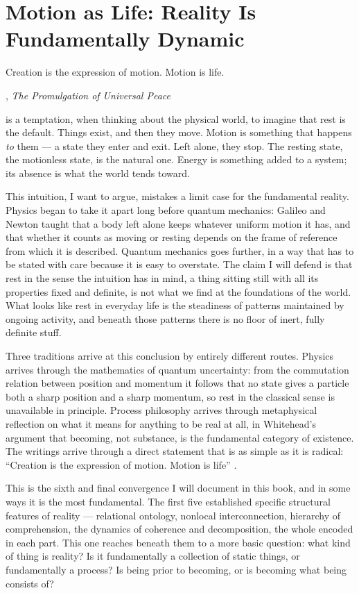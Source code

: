\chapter{Motion as Life: Reality Is Fundamentally Dynamic}
\label{ch:motion-as-life}

\epigraph{Creation is the expression of motion. Motion is life.}{\AbdulBaha,
  \textit{The Promulgation of Universal Peace}}

 is a temptation, when thinking about the physical world, to imagine that rest is the default. Things exist, and then they move. Motion is something that happens \emph{to} them — a state they enter and exit. Left alone, they stop. The resting state, the motionless state, is the natural one. Energy is something added to a system; its absence is what the world tends toward.

This intuition, I want to argue, mistakes a limit case for the fundamental reality. Physics began to take it apart long before quantum mechanics: Galileo and Newton taught that a body left alone keeps whatever uniform motion it has, and that whether it counts as moving or resting depends on the frame of reference from which it is described. Quantum mechanics goes further, in a way that has to be stated with care because it is easy to overstate. The claim I will defend is that rest in the sense the intuition has in mind, a thing sitting still with all its properties fixed and definite, is not what we find at the foundations of the world. What looks like rest in everyday life is the steadiness of patterns maintained by ongoing activity, and beneath those patterns there is no floor of inert, fully definite stuff.

Three traditions arrive at this conclusion by entirely different routes. Physics arrives through the mathematics of quantum uncertainty: from the commutation relation between position and momentum it follows that no state gives a particle both a sharp position and a sharp momentum, so rest in the classical sense is unavailable in principle. Process philosophy arrives through metaphysical reflection on what it means for anything to be real at all, in Whitehead's argument that becoming, not substance, is the fundamental category of existence. The \bahai writings arrive through a direct statement that is as simple as it is radical: ``Creation is the expression of motion. Motion is life'' \citep[Talk 52]{PUP}.

This is the sixth and final convergence I will document in this book, and in some ways it is the most fundamental. The first five established specific structural features of reality — relational ontology, nonlocal interconnection, hierarchy of comprehension, the dynamics of coherence and decomposition, the whole encoded in each part. This one reaches beneath them to a more basic question: what kind of thing is reality? Is it fundamentally a collection of static things, or fundamentally a process? Is being prior to becoming, or is becoming what being consists of?

